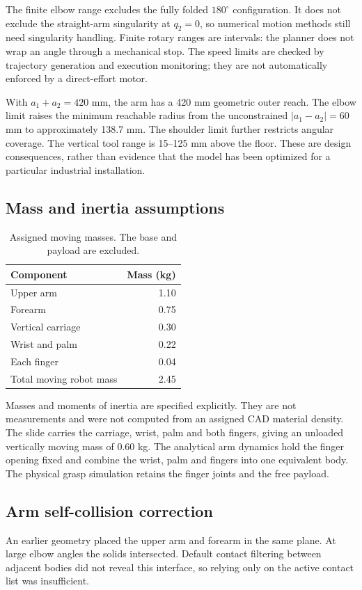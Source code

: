 \documentclass[11pt,a4paper]{article}
\begin{document}
The finite elbow range excludes the fully folded $180^\circ$ configuration.
It does not exclude the straight-arm singularity at $q_2=0$, so numerical
motion methods still need singularity handling. Finite rotary ranges are
intervals: the planner does not wrap an angle through a mechanical stop.
The speed limits are checked by trajectory generation and execution
monitoring; they are not automatically enforced by a direct-effort motor.

With $a_1+a_2=420$ mm, the arm has a 420 mm geometric outer reach. The elbow
limit raises the minimum reachable radius from the unconstrained
$|a_1-a_2|=60$ mm to approximately 138.7 mm. The shoulder limit further
restricts angular coverage. The vertical tool range is 15--125 mm above the
floor. These are design consequences, rather than evidence that the model
has been optimized for a particular industrial installation.

\subsection{Mass and inertia assumptions}
\begin{table}[htbp]\centering
\caption{Assigned moving masses. The base and payload are excluded.}\label{tab:masses}
\begin{tabular}{@{}lr@{}}\toprule
Component & Mass (kg)\\\midrule
Upper arm & 1.10\\
Forearm & 0.75\\
Vertical carriage & 0.30\\
Wrist and palm & 0.22\\
Each finger & 0.04\\\midrule
Total moving robot mass & 2.45\\
\bottomrule\end{tabular}\end{table}

Masses and moments of inertia are specified explicitly. They are not
measurements and were not computed from an assigned CAD material density.
The slide carries the carriage, wrist, palm and both fingers, giving an
unloaded vertically moving mass of 0.60 kg. The analytical arm dynamics hold
the finger opening fixed and combine the wrist, palm and fingers into one
equivalent body. The physical grasp simulation retains the finger joints
and the free payload.

\subsection{Arm self-collision correction}
An earlier geometry placed the upper arm and forearm in the same plane.
At large elbow angles the solids intersected. Default contact filtering
between adjacent bodies did not reveal this interface, so relying only on
the active contact list was insufficient.
\end{document}
